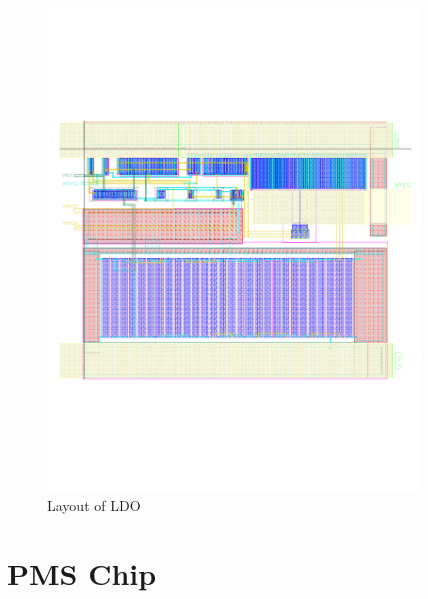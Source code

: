 \documentclass[12pt,a4paper,UKenglish]{report}
\begin{document}
\begin{appendices}
\begin{figure} [!htbp]	%
 	\centering
  	\includegraphics[width=0.88\textwidth]{appendix/layout_ldo_p.pdf} 
 	\caption{Layout of LDO} 
	\label{fig:appen_layout_ldo} 
\end{figure}




\chapter{PMS Chip}


\end{appendices}
\end{document}
